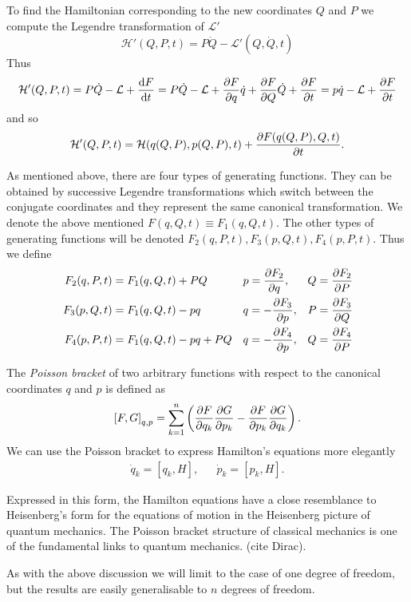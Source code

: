 \documentclass[../thesis.tex]{subfiles}
\theoremstyle{plain}
\begin{document}
To find the Hamiltonian corresponding to the new coordinates $Q$ and $P$ we
compute the Legendre transformation of \(\mathcal{L'}\)
\[
  \mathcal{H'}(Q, P, t) = P\dot{Q} - \mathcal{L'}(Q, \dot{Q}, t)
\]
Thus
\[
  \mathcal{H'}(Q, P, t) = P\dot{Q} - \mathcal{L} + \dv{F}{t} =
  P\dot{Q} - \mathcal{L} + \pdv{F}{q} \dot{q} + \pdv{F}{Q} \dot{Q} + \pdv{F}{t} =
  p\dot{q} - \mathcal{L} + \pdv{F}{t}
\]
and so
\begin{equation}
  \label{eq:canonical-transf}
  \mathcal{H'}(Q, P, t) = \mathcal{H}(q(Q,P), p(Q, P), t) + \pdv{F(q(Q,P), Q, t)}{t}.
\end{equation}

As mentioned above, there are four types of generating functions. They can be obtained
by successive Legendre transformations which switch between the conjugate coordinates and
they represent the same canonical transformation. We denote the above mentioned
\(F(q, Q, t) \equiv F_1(q, Q, t)\). The other types of generating functions will be denoted
\(F_2(q, P, t), F_3(p, Q, t), F_4(p, P, t)\). Thus we define
\begin{align*}
  F_2(q, P, t) &= F_1(q, Q, t) + PQ &&
  p = \pdv{F_2}{q}, & Q = \pdv{F_2}{P} \\
  F_3(p, Q, t) &= F_1(q, Q, t) - pq &&
  q = - \pdv{F_3}{p}, & P = \pdv{F_3}{Q} \\
  F_4(p, P, t) &= F_1(q, Q, t) - pq + PQ &&
  q = - \pdv{F_4}{p}, & Q = \pdv{F_4}{P}
\end{align*}

The \emph{Poisson bracket} of two arbitrary functions with respect to the canonical coordinates
$q$ and $p$ is defined as
\[
  {\left[F, G\right]}_{q,p} = \sum_{k=1}^n \left( \pdv{F}{q_k} \pdv{G}{p_k} -
                                                  \pdv{F}{p_k} \pdv{G}{q_k} \right).
\]
We can use the Poisson bracket to express Hamilton's equations more elegantly
\begin{align*}
  \dot{q}_k = [q_k,H], && \dot{p}_k = [p_k,H].
\end{align*}

Expressed in this form, the Hamilton equations have a close resemblance to
Heisenberg's form for the equations of motion in the Heisenberg picture of
quantum mechanics. The Poisson bracket structure of classical mechanics is
one of the fundamental links to quantum mechanics. \cite{Dirac1967} {\color{red}(cite Dirac)}.

As with the above discussion we will limit to the case of one degree of freedom,
but the results are easily generalisable to $n$ degrees of freedom.
\end{document}
